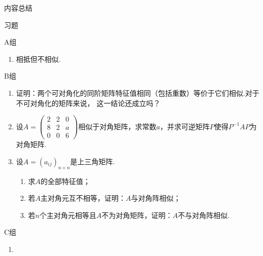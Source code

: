 \vspace{2ex}
\centerline{\heiti \Large 内容总结}

\vspace{2ex}

\centerline{\heiti \Large 习题}
\vspace{2ex}
{\kaishu }
\begin{flushright}
    \kaishu

\end{flushright}
\centerline{\heiti A组}
\begin{enumerate}
    \item 相抵但不相似.
\end{enumerate}
\centerline{\heiti B组}
\begin{enumerate}
    \item 证明：两个可对角化的同阶矩阵特征值相同（包括重数）等价于它们相似.对于不可对角化的矩阵来说，
    这一结论还成立吗？
    \item 设$A=\begin{pmatrix}
        2 & 2 & 0 \\ 8 & 2 & a \\ 0 & 0 & 6
    \end{pmatrix}$相似于对角矩阵，求常数$a$，并求可逆矩阵$P$使得$P^{-1}AP$为对角矩阵.
    \item 设$A=(a_{ij})_{n\times n}$是上三角矩阵.
    \begin{enumerate}[label=(\arabic*)]
        \item 求$A$的全部特征值；

        \item 若$A$主对角元互不相等，证明：$A$与对角阵相似；

        \item 若$n$个主对角元相等且$A$不为对角矩阵，证明：$A$不与对角阵相似.
    \end{enumerate}
\end{enumerate}
\centerline{\heiti C组}
\begin{enumerate}
    \item
\end{enumerate}
